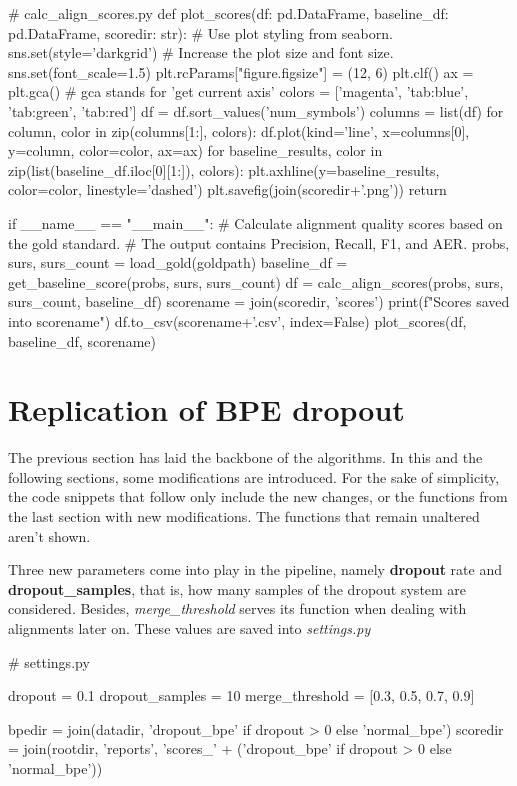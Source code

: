 \begin{python}
# calc_align_scores.py
def plot_scores(df: pd.DataFrame, baseline_df: pd.DataFrame, scoredir: str):
  # Use plot styling from seaborn.
  sns.set(style='darkgrid')
  # Increase the plot size and font size.
  sns.set(font_scale=1.5)
  plt.rcParams["figure.figsize"] = (12, 6)
  plt.clf()
  ax = plt.gca() # gca stands for 'get current axis'
  colors = ['magenta', 'tab:blue', 'tab:green', 'tab:red']
  df = df.sort_values('num_symbols')
  columns = list(df)
  for column, color in zip(columns[1:], colors):
    df.plot(kind='line', x=columns[0], y=column, color=color, ax=ax)
  for baseline_results, color in zip(list(baseline_df.iloc[0][1:]), colors):
    plt.axhline(y=baseline_results, color=color, linestyle='dashed')
  plt.savefig(join(scoredir+'.png'))
  return

if __name__ == "__main__":
  # Calculate alignment quality scores based on the gold standard.
  # The output contains Precision, Recall, F1, and AER.
  probs, surs, surs_count = load_gold(goldpath)
  baseline_df = get_baseline_score(probs, surs, surs_count)
  df = calc_align_scores(probs, surs, surs_count, baseline_df)
  scorename = join(scoredir, 'scores')
  print(f"Scores saved into {scorename}")
  df.to_csv(scorename+'.csv', index=False)
  plot_scores(df, baseline_df, scorename)
\end{python}

\section{Replication of BPE dropout}

The previous section has laid the backbone of the algorithms. In this and the following sections, some modifications are introduced. For the sake of simplicity, the code snippets that follow only include the new changes, or the functions from the last section with new modifications. The functions that remain unaltered aren't shown.

Three new parameters come into play in the pipeline, namely \textbf{dropout} rate and \textbf{dropout\_samples}, that is, how many samples of the dropout system are considered. Besides, \emph{merge\_threshold} serves its function when dealing with alignments later on. These values are saved into \emph{settings.py}

\begin{python}
# settings.py

dropout = 0.1
dropout_samples = 10
merge_threshold = [0.3, 0.5, 0.7, 0.9]

bpedir = join(datadir, 'dropout_bpe' if dropout > 0 else 'normal_bpe')
scoredir = join(rootdir, 'reports', 'scores_' + ('dropout_bpe' if dropout > 0 else 'normal_bpe'))
\end{python}

